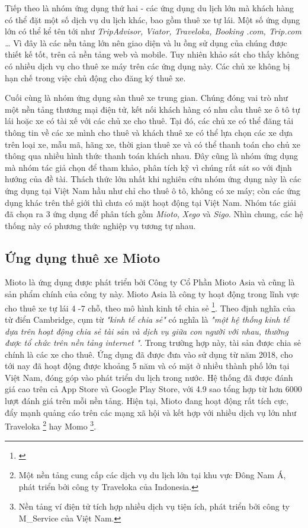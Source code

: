 \documentclass[../main.tex]{subfiles}
\begin{document}
	Tiếp theo là nhóm ứng dụng thứ hai - các ứng dụng du lịch lớn mà khách hàng có thể đặt một số dịch vụ du lịch khác,
	bao gồm thuê xe tự lái. Một số ứng dụng lớn có thể kể tên tới như \emph{
		TripAdvisor, Viator, Traveloka, Booking .com, Trip.com \ldots} Vì đây là các nền tảng lớn nên giao diện và lu
	ồng sử dụng của chúng được thiết kế tốt, trên cả nền tảng web và mobile. Tuy nhiên khảo sát cho thấy không có
	nhiều dịch vụ cho thuê xe máy trên các ứng dụng này. Các chủ xe không bị hạn chế trong việc chủ động cho đăng ký
	thuê xe.

	Cuối cùng là nhóm ứng dụng sàn thuê xe trung gian. Chúng đóng vai trò như một nền tảng thương mại điện tử, kết nối
	khách hàng có nhu cầu thuê xe ô tô tự lái hoặc xe có tài xế với các chủ xe cho thuê. Tại đó, các chủ xe có thể
	đăng tải thông tin về các xe mình cho thuê và khách thuê xe có thể lựa chọn các xe dựa trên loại xe, mẫu mã, hãng
	xe, thời gian thuê xe và có thể thanh toán cho chủ xe thông qua nhiều hình thức thanh toán khách nhau. Đây cũng là
	nhóm ứng dụng mà nhóm tác giả chọn để tham khảo, phân tích kỹ vì chúng rất sát so với định hướng của đề tài. Thách
	thức lớn nhất khi nghiên cứu nhóm ứng dụng này là các ứng dụng tại Việt Nam hầu như chỉ cho thuê ô tô, không có xe
	máy; còn các ứng dụng khác trên thế giới thì chưa có mặt hoạt động tại Việt Nam. Nhóm tác giải đã chọn ra 3 ứng
	dụng để phân tích gồm \emph{Mioto}, \emph{Xego} và \emph{Sigo}. Nhìn chung, các hệ thống này có phương thức nghiệp
	vụ tương tự nhau.

	\subsection{Ứng dụng thuê xe Mioto}

	Mioto là ứng dụng được phát triển bởi Công ty Cổ Phần Mioto Asia và cũng là sản phẩm chính của công ty này. Mioto
	Asia là công ty hoạt động trong lĩnh vực cho thuê xe tự lái 4 -7 chỗ, theo mô hình kinh tế chia sẻ
	\footnote{
		\cite{aboutMioto}
	}.
	Theo định nghĩa của từ điển Cambridge, cụm từ \emph{"kinh tế chia sẻ"} có nghĩa là \emph{"một hệ thống kinh tế
	dựa trên hoạt động chia sẻ tài sản và dịch vụ giữa con người với nhau, thường được tổ chức trên nền tảng internet
	"}. Trong trường hợp này, tài sản được chia sẻ chính là các xe cho thuê.
	Ứng dụng đã được đưa vào sử dụng từ năm 2018, cho tới nay đã hoạt động được khoảng 5 năm và có mặt ở nhiều thành
	phố lớn tại Việt Nam, đóng góp vào phát triển du lịch trong nước. Hệ thống đã được đánh giá cao trên cả App Store
	và Google Play Store, với 4.9 sao tổng hợp từ hơn 6000 lượt đánh giá trên mỗi nền tảng. Hiện tại, Mioto đang
	hoạt động rất tích cực, đẩy mạnh quảng cáo trên các mạng xã hội và kết hợp với nhiều dịch vụ lớn như
	Traveloka \footnote{
		Một nền tảng cung cấp các dịch vụ du lịch lớn tại khu vực Đông Nam Á, phát triển bởi công ty Traveloka của
		Indonesia.
	}
	hay Momo \footnote{
		Nền tảng ví điện tử tích hợp nhiều dịch vụ tiện ích, phát triển bởi công ty M\_Service của Việt Nam.
	}.
\end{document}

